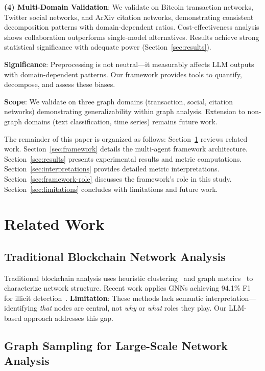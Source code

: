 \documentclass[conference]{IEEEtran}
\begin{document}
\textbf{(4) Multi-Domain Validation}: We validate on Bitcoin transaction networks, Twitter social networks, and ArXiv citation networks, demonstrating consistent decomposition patterns with domain-dependent ratios. Cost-effectiveness analysis shows collaboration outperforms single-model alternatives. Results achieve strong statistical significance with adequate power (Section~\ref{sec:results}).

\textbf{Significance}: Preprocessing is not neutral—it measurably affects LLM outputs with domain-dependent patterns. Our framework provides tools to quantify, decompose, and assess these biases.

\textbf{Scope}: We validate on three graph domains (transaction, social, citation networks) demonstrating generalizability within graph analysis. Extension to non-graph domains (text classification, time series) remains future work.

The remainder of this paper is organized as follows: Section~\ref{sec:related} reviews related work. Section~\ref{sec:framework} details the multi-agent framework architecture. Section~\ref{sec:results} presents experimental results and metric computations. Section~\ref{sec:interpretations} provides detailed metric interpretations. Section~\ref{sec:framework-role} discusses the framework's role in this study. Section~\ref{sec:limitations} concludes with limitations and future work.

\section{Related Work}\label{sec:related}

\subsection{Traditional Blockchain Network Analysis}

Traditional blockchain analysis uses heuristic clustering~\cite{reid2011,meiklejohn2013fistful} and graph metrics~\cite{ron2013quantitative,bovet2019} to characterize network structure. Recent work applies GNNs achieving 94.1\% F1 for illicit detection~\cite{weber2019,elliptic2019}. \textbf{Limitation}: These methods lack semantic interpretation—identifying \textit{that} nodes are central, not \textit{why} or \textit{what} roles they play. Our LLM-based approach addresses this gap.

\subsection{Graph Sampling for Large-Scale Network Analysis}
\end{document}
